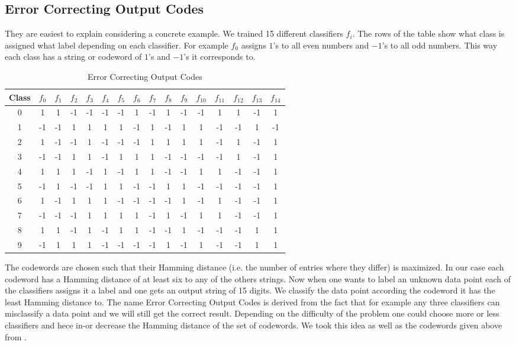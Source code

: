 \subsection{Error Correcting Output Codes}
They are easiest to explain considering a concrete example. We trained 15 different classifiers $f_i$. The rows of the table show what class is assigned what label depending on each classifier. For example $f_0$ assigns $1$'s to all even numbers and $-1$'s to all odd numbers. This way each class has a string or codeword of $1$'s and $-1$'s it corresponds to.

\begin{table}[ht!]
	\centering
	\caption{Error Correcting Output Codes}
	\label{Codewords}
	\begin{tabular}{|c|c|c|c|c|c|c|c|c|c|c|c|c|c|c|c|}
		\hline
		Class	& $f_0$ & $f_1$ & $f_2$ & $f_3$ & $f_4$ & $f_5$ & $f_6$ & $f_7$ & $f_8$ & $f_9$ & $f_{10}$ & $f_{11}$ & $f_{12}$ & $f_{13}$ & $f_{14}$ \\ \hline \hline
		0	& 1 & 1 & -1 & -1 & -1 & -1 & 1 & -1 & 1 & -1 & -1 & 1 & 1 & -1 & 1 \\ \hline
		1	& -1 & -1 & 1 & 1 & 1 & 1 & -1 & 1 & -1 & 1 & 1 & -1 & -1 & 1 & -1 \\ \hline
		2	& 1 & -1 & -1 & 1 & -1 & -1 & -1 & 1 & 1 & 1 & 1 & -1 & 1 & -1 & 1 \\ \hline
		3	& -1 & -1 & 1 & 1 & -1 & 1 & 1 & 1 & -1 & -1 & -1 & -1 & 1 & -1 & 1 \\ \hline
		4	& 1 & 1 & 1 & -1 & 1 & -1 & 1 & 1 & -1 & -1 & 1 & 1 & -1 & -1 & 1 \\ \hline
		5	& -1 & 1 & -1 & -1 & 1 & 1 & -1 & -1 & 1 & 1 & -1 & -1 & -1 & -1 & 1 \\ \hline
		6	& 1 & -1 & 1 & 1 & 1 & -1 & -1 & -1 & -1 & 1 & -1 & 1 & -1 & -1 & 1 \\ \hline
		7	& -1 & -1 & -1 & 1 & 1 & 1 & 1 & -1 & 1 & -1 & 1 & 1 & -1 & -1 & 1 \\ \hline
		8	& 1 & 1 & -1 & 1 & -1 & 1 & 1 & -1 & -1 & 1 & -1 & -1 & -1 & 1 & 1 \\ \hline
		9	& -1 & 1 & 1 & 1 & -1 & -1 & -1 & -1 & 1 & -1 & 1 & -1 & -1 & 1 & 1 \\ \hline
	\end{tabular}
\end{table}  

The codewords are chosen such that their Hamming distance (i.e. the number of entries where they differ) is maximized. In our case each codeword has a Hamming distance of at least six to any of the others strings. Now when one wants to label an unknown data point each of the classifiers assigns it a label and one gets an output string of 15 digits. We classify the data point according the codeword it has the least Hamming distance to. The name Error Correcting Output Codes is derived from the fact that for example any three classifiers can misclassify a data point and we will still get the correct result. Depending on the difficulty of the problem one could choose more or less classifiers and hece in-or decrease the Hamming distance of the set of codewords. We took this idea as well as the codewords given above from \cite{dietterich1995solving}.


